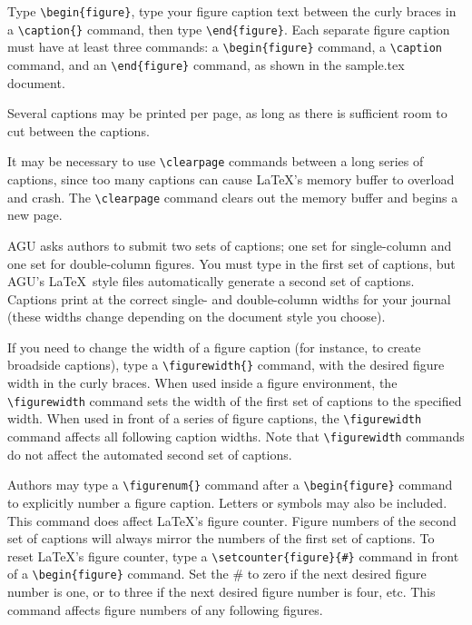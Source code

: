 \begin{article}
Type \verb"\begin{figure}", type your figure caption 
text between the curly braces in a \verb"\caption{}" 
command, then type \verb"\end{figure}".  Each separate 
figure caption must have at least three commands: a
\verb"\begin{figure}" command, a \verb"\caption" command, 
and an \verb"\end{figure}" command, as shown in the 
sample.tex document.

Several captions may be printed per page, as long 
as there is sufficient room to cut between the captions.

It may be necessary to use \verb"\clearpage" commands 
between a long series of captions, since too many 
captions can cause \LaTeX's memory buffer to overload 
and crash.  The \verb"\clearpage" command clears out 
the memory buffer and begins a new page.

AGU asks authors to submit two sets of captions; one 
set for single-column and one set for double-column 
figures.  You must type in the first set of captions, 
but AGU's \LaTeX\ style files automatically generate 
a second set of captions.  Captions print at the 
correct single- and double-column widths for your 
journal (these widths change depending on the 
document style you choose).

If you need to change the width of a figure caption
(for instance, to create broadside captions), type a 
\verb"\figurewidth{}" command, with the desired
figure width in the curly braces.  When used inside 
a figure environment, the \verb"\figurewidth" command sets 
the width of the first set of captions to the specified 
width.  When used in front of a series of figure captions,
the \verb"\figurewidth" command affects all following
caption widths.  Note that \verb"\figurewidth" commands 
do not affect the automated second set of captions.

Authors may type a \verb"\figurenum{}" command after
a \verb"\begin{figure}" command to explicitly number a
figure caption.  Letters or symbols may also be included.
This command does affect \LaTeX's figure counter.  Figure 
numbers of the second set of captions will always mirror 
the numbers of the first set of captions.  To reset 
\LaTeX's figure counter, type a \verb"\setcounter{figure}{#}" 
command in front of a \linebreak
\verb"\begin{figure}" command.  Set the \# to zero if 
the next desired figure number is one, or to three if the
next desired figure number is four, etc.  This command 
affects figure numbers of any following figures.


\end{article}
